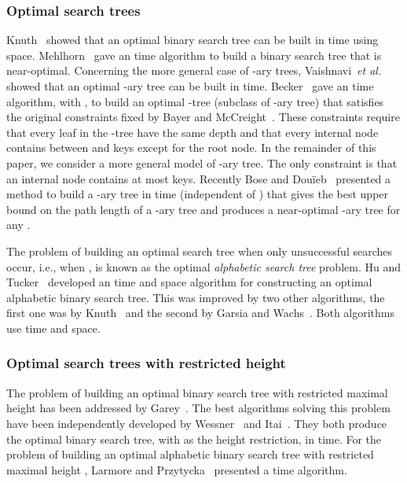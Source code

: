\documentclass{llncs}\usepackage[english]{babel}
\begin{document}
\subsubsection*{Optimal search trees}
Knuth~\cite{optbst} showed that an optimal binary search tree can be built in  time using  space. Mehlhorn~\cite{mehlornbestbound} gave an  time algorithm to build a binary search tree that is near-optimal. Concerning the more general case of -ary trees, Vaishnavi~\emph{et al.}~\cite{optbtrees} showed that an optimal -ary tree can be built in  time. Becker~\cite{newoptbtrees} gave an  time algorithm, with , to build an optimal -tree (subclass of -ary tree) that satisfies the original constraints fixed by Bayer and McCreight~\cite{btrees}. These constraints require that every leaf in the -tree have the same depth and that every internal node contains between  and  keys except for the root node. In the remainder of this paper, we consider a more general model of -ary tree. The only constraint is that an internal node contains at most  keys. Recently Bose and Dou\"ieb~\cite{nearoptbtree} presented a method to build a -ary tree in  time (independent of ) that gives the best upper bound on the path length of a -ary tree and produces a near-optimal -ary tree for any . 

The problem of building an optimal search tree when only unsuccessful searches occur, i.e., when , is known as the optimal \emph{alphabetic search tree} problem. Hu and Tucker~\cite{n2optalphatrees} developed an  time and  space algorithm for constructing an optimal alphabetic binary search tree. This was improved by two other algorithms, the first one was by Knuth~\cite{knuthart} and the second by Garsia and Wachs~\cite{Garsiaoptalphatrees}. Both algorithms use  time and  space. 

\subsubsection*{Optimal search trees with restricted height}
The problem of building an optimal binary search tree with restricted maximal height has been addressed by Garey~\cite{Garey}. The best algorithms solving this problem have been independently developed by Wessner~\cite{Wessner} and Itai~\cite{Itai}. They both produce the optimal binary search tree, with   as the height restriction, in  time. For the problem of building an optimal alphabetic binary search tree with restricted maximal height , Larmore and Przytycka~\cite{larmoreAlpha} presented a  time algorithm. 
\end{document}
